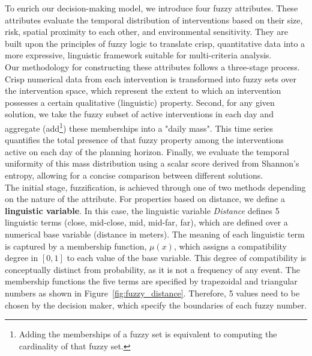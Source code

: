 To enrich our decision-making model, we introduce four fuzzy attributes. These attributes evaluate the temporal distribution of interventions based on their size, risk, spatial proximity to each other, and environmental sensitivity. They are built upon the principles of fuzzy logic to translate crisp, quantitative data into a more expressive, linguistic framework suitable for multi-criteria analysis.\\

Our methodology for constructing these attributes follows a three-stage process. Crisp numerical data from each intervention is transformed into fuzzy sets over the intervention space, which represent the extent to which an intervention possesses a certain qualitative (linguistic) property. Second, for any given solution, 
we take the fuzzy subset of active interventions in each day and aggregate (add\footnote{Adding the memberships of a fuzzy set is equivalent to computing the cardinality of that fuzzy set.}) these memberships into a "daily mass". This time series quantifies the total presence of that fuzzy property among the interventions active on each day of the planning horizon. Finally, we evaluate the temporal uniformity of this mass distribution using a scalar score derived from Shannon's entropy, allowing for a concise comparison between different solutions.\\

The initial stage, fuzzification, is achieved through one of two methods depending on the nature of the attribute. For properties based on distance, we define a \textbf{linguistic variable}. In this case, the linguistic variable \textit{Distance} defines 5 linguistic terms (close, mid-close, mid, mid-far, far), which are defined over a numerical base variable (distance in meters). The meaning of each linguistic term is captured by a membership function, $\mu(x)$, which assigns a compatibility degree in $[0, 1]$ to each value of the base variable. This degree of compatibility is conceptually distinct from probability, as it is not a frequency of any event. The membership functions the five terms are specified by trapezoidal and triangular numbers as shown in Figure~\ref{fig:fuzzy_distance}. Therefore, 5 values need to be chosen by the decision maker, which specify the boundaries of each fuzzy number.\\


